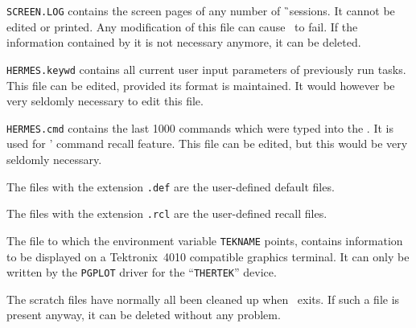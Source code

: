 {\tt SCREEN.LOG} contains the screen pages of any number of \G\
sessions. It cannot be edited or printed. Any modification of this file can
cause \tH\ to fail. If the information contained by it is not necessary
anymore, it can be deleted.

{\tt HERMES.keywd} contains all current user input parameters of
previously run tasks. This file can be edited, provided its format is
maintained. It would however be very seldomly necessary to edit this file.

{\tt HERMES.cmd} contains the last 1000 commands which were typed into
the \UCA. It is used for \tH' command recall feature.
This file can be edited, but this would be very seldomly necessary.

The files with the extension {\tt .def} are the user-defined default files.

The files with the extension {\tt .rcl} are the user-defined recall files.

The file to which the environment variable {\tt TEKNAME} points, contains
information to be displayed on a Tektronix~4010 compatible graphics
terminal. It can only be written by the {\tt PGPLOT} driver for the
``{\tt THERTEK}'' device.

The scratch files have normally all been cleaned up when \tH\ exits. If such
a file is present anyway, it can be deleted without any problem.


